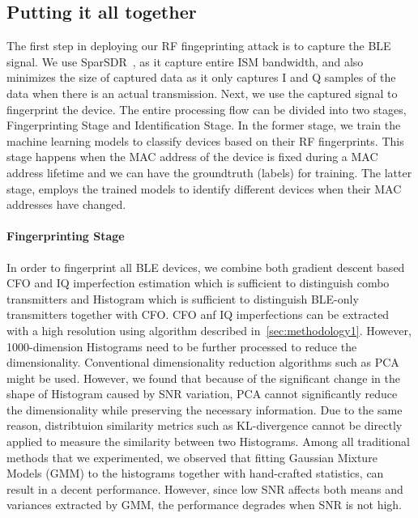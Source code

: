 \subsection{Putting it all together}


The first step in deploying our RF fingeprinting attack is to capture the BLE signal. We use SparSDR~\cite{?}, as it capture entire ISM bandwidth, and also minimizes the size of captured data as it only captures I and Q samples of the data when there is an actual transmission. Next, we use the captured signal to fingerprint the device. The entire processing flow can be divided into two stages, Fingerprinting Stage and Identification Stage. In the former stage, we train the machine learning models to classify devices based on their RF fingerprints. This stage happens when the MAC address of the device is fixed during a MAC address lifetime and we can have the groundtruth (labels) for training. The latter stage, employs the trained models to identify different devices when their MAC addresses have changed.


\paragraph{Fingerprinting Stage} In order to fingerprint all BLE devices, we combine both gradient descent based CFO and IQ imperfection estimation which is sufficient to distinguish combo transmitters and Histogram which is sufficient to distinguish BLE-only transmitters together with CFO. CFO anf IQ imperfections can be extracted with a high resolution using algorithm described in~\ref{sec:methodology1}. However, 1000-dimension Histograms need to be further processed to reduce the dimensionality. Conventional dimensionality reduction algorithms such as PCA might be used. However, we found that because of the significant change in the shape of Histogram caused by SNR variation, PCA cannot significantly reduce the dimensionality while preserving the necessary information. Due to the same reason, distribtuion similarity metrics such as KL-divergence cannot be directly applied to measure the similarity between two Histograms. Among all traditional methods that we experimented, we observed that fitting Gaussian Mixture Models (GMM) to the histograms together with hand-crafted statistics, can result in a decent performance. However, since low SNR affects both means and variances extracted by GMM, the performance degrades when SNR is not high.

